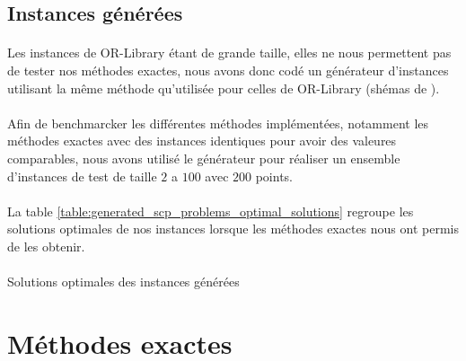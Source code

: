\documentclass[12pt,letterpaper,twoside]{article}
\begin{document}
		\subsection{Instances générées}\label{sec:generated-instances}
			\paragraph*{}
				Les instances de OR-Library étant de grande taille, elles ne nous permettent pas de tester nos méthodes exactes, nous avons donc codé un générateur d'instances utilisant la même méthode qu'utilisée pour celles de OR-Library (shémas de \citeauthor{Balas1980}\cite{Balas1980}).
			\paragraph*{}
				Afin de benchmarcker les différentes méthodes implémentées, notamment les méthodes exactes avec des instances identiques pour avoir des valeures comparables, nous avons utilisé le générateur pour réaliser un ensemble d'instances de test de taille \(2\) a \(100\) avec \(200\) points.
			\paragraph*{}
				La table \ref{table:generated_scp_problems_optimal_solutions} regroupe les solutions optimales de nos instances lorsque les méthodes exactes nous ont permis de les obtenir.
			\paragraph*{}
			\begin{table}[H]
				\centering
				\begin{minipage}[t]{0.3\linewidth}
					\centering
					
				\end{minipage}
				\begin{minipage}[t]{0.3\linewidth}
					\centering
					
				\end{minipage}
				\begin{minipage}[t]{0.3\linewidth}
					\centering
					
				\end{minipage}
				\caption{Solutions optimales des instances générées}
				\label{table:generated_scp_problems_optimal_solutions}
			\end{table}
	\section{Méthodes exactes}
\end{document}
